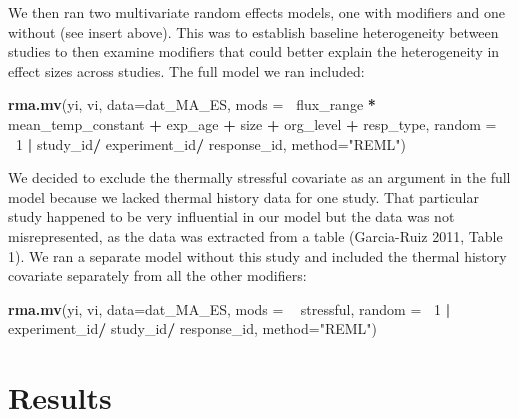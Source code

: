\documentclass[12pt,twoside]{reedthesis}
\newenvironment{Shaded}{\begin{snugshade}}{\end{snugshade}}
\newcommand{\DataTypeTok}[1]{\textcolor[rgb]{0.13,0.29,0.53}{#1}}
\newcommand{\DecValTok}[1]{\textcolor[rgb]{0.00,0.00,0.81}{#1}}
\newcommand{\KeywordTok}[1]{\textcolor[rgb]{0.13,0.29,0.53}{\textbf{#1}}}
\newcommand{\NormalTok}[1]{#1}
\newcommand{\OperatorTok}[1]{\textcolor[rgb]{0.81,0.36,0.00}{\textbf{#1}}}
\newcommand{\StringTok}[1]{\textcolor[rgb]{0.31,0.60,0.02}{#1}}
\begin{document}
We then ran two multivariate random effects models, one with modifiers and one without (see insert above). This was to establish baseline heterogeneity between studies to then examine modifiers that could better explain the heterogeneity in effect sizes across studies. The full model we ran included:
\begin{Shaded}
\begin{Highlighting}[]
\KeywordTok{rma.mv}\NormalTok{(yi, vi, }\DataTypeTok{data=}\NormalTok{dat_MA_ES, }\DataTypeTok{mods =} \OperatorTok{~}\NormalTok{flux_range }\OperatorTok{*}\StringTok{ }\NormalTok{mean_temp_constant }
       \OperatorTok{+}\StringTok{ }\NormalTok{exp_age }\OperatorTok{+}\StringTok{ }\NormalTok{size }\OperatorTok{+}\StringTok{ }\NormalTok{org_level }\OperatorTok{+}\StringTok{ }\NormalTok{resp_type, }
               \DataTypeTok{random =} \OperatorTok{~}\DecValTok{1} \OperatorTok{|}\StringTok{  }\NormalTok{study_id}\OperatorTok{/}\StringTok{ }\NormalTok{experiment_id}\OperatorTok{/}\StringTok{ }\NormalTok{response_id,}
                 \DataTypeTok{method=}\StringTok{"REML"}\NormalTok{) }
\end{Highlighting}
\end{Shaded}
We decided to exclude the thermally stressful covariate as an argument in the full model because we lacked thermal history data for one study. That particular study happened to be very influential in our model but the data was not misrepresented, as the data was extracted from a table (Garcia-Ruiz 2011, Table 1). We ran a separate model without this study and included the thermal history covariate separately from all the other modifiers:
\begin{Shaded}
\begin{Highlighting}[]
\KeywordTok{rma.mv}\NormalTok{(yi, vi, }\DataTypeTok{data=}\NormalTok{dat_MA_ES, }\DataTypeTok{mods =}  \OperatorTok{~}\StringTok{ }\NormalTok{stressful, }
               \DataTypeTok{random =} \OperatorTok{~}\DecValTok{1} \OperatorTok{|}\StringTok{ }\NormalTok{experiment_id}\OperatorTok{/}\StringTok{ }\NormalTok{study_id}\OperatorTok{/}\StringTok{ }\NormalTok{response_id,}
                 \DataTypeTok{method=}\StringTok{"REML"}\NormalTok{) }
\end{Highlighting}
\end{Shaded}
\hypertarget{results}{%
\chapter*{Results}\label{results}}
\end{document}
